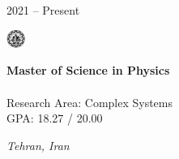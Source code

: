 \documentclass[9pt, purple]{./template/cv} %
\begin{document}
\begin{minipage}{\linewidth}
    \vspace{6mm}
    \begin{minipage}[t]{0.15\linewidth}
        \vspace{-\baselineskip}
        \textcolor{soft}{2021 -- Present} 
    \end{minipage}
    \begin{minipage}[t]{8mm}
        \vspace{-\baselineskip}
        \includegraphics[width=6mm]{img/sharif}\centering
    \end{minipage}
    \begin{minipage}[t]{0.5\linewidth}
        \vspace{-\baselineskip}
        {\textcolor{accentbackground}{\textbf{Master of Science in Physics}}} \\
         \\
        Research Area: Complex Systems\\
        GPA: 18.27 / 20.00
    \end{minipage}
    \hfill
    \begin{minipage}[t]{0.1\linewidth}
        \vspace{-\baselineskip}
        \textcolor{accentbackground}{\textit{Tehran, Iran}} 
    \end{minipage}
    

\end{minipage}
\end{document}
